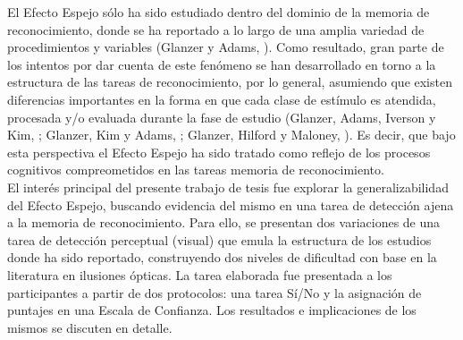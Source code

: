 El Efecto Espejo sólo ha sido estudiado dentro del dominio de la memoria de reconocimiento, donde se ha reportado a lo largo de una amplia variedad de procedimientos y variables (Glanzer y Adams, \citeyear{Glanzer1990}). Como resultado, gran parte de los intentos por dar cuenta de este fenómeno se han desarrollado en torno a la estructura de las tareas de reconocimiento, por lo general, asumiendo que existen diferencias importantes en la forma en que cada clase de estímulo es atendida, procesada y/o evaluada durante la fase de estudio (Glanzer, Adams, Iverson y Kim, \citeyear{Glanzer1993}; Glanzer, Kim y Adams, \citeyear{Glanzer1998}; Glanzer, Hilford y Maloney, \citeyear{Glanzer2009}). Es decir, que bajo esta perspectiva el Efecto Espejo ha sido tratado como reflejo de los procesos cognitivos compreometidos en las tareas memoria de reconocimiento.\\

El interés principal del presente trabajo de tesis fue explorar la generalizabilidad del Efecto Espejo, buscando evidencia del mismo en una tarea de detección ajena a la memoria de reconocimiento. Para ello, se presentan dos variaciones de una tarea de detección perceptual (visual) que emula la estructura de los estudios donde ha sido reportado, construyendo dos niveles de dificultad con base en la literatura en ilusiones ópticas. La tarea elaborada fue presentada a los participantes a partir de dos protocolos: una tarea Sí/No y la asignación de puntajes en una Escala de Confianza. Los resultados e implicaciones de los mismos se discuten en detalle.\\